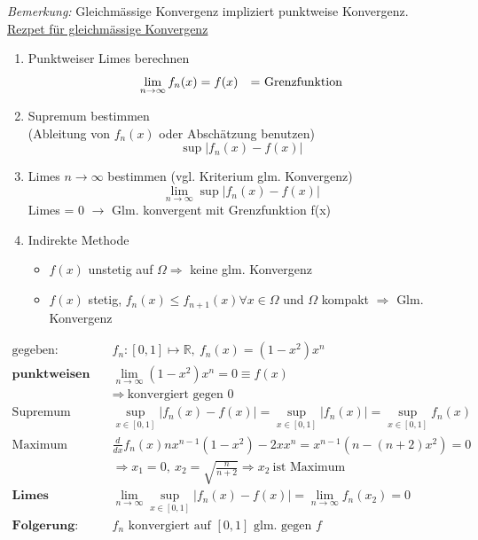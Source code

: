 \emph{Bemerkung:} Gleichm{\"a}ssige Konvergenz impliziert punktweise Konvergenz.\\
\underline{Rezpet f{\"u}r gleichm{\"a}ssige Konvergenz} 
\begin{enumerate}[label=(\roman*)]
	\item Punktweiser Limes berechnen
				\[
						\lim_{n\rightarrow\infty}f_n(x) = f(x) \text{\quad = Grenzfunktion}
				\]
	\item Supremum bestimmen \\
				(Ableitung von $f_n(x)$  oder Absch{\"a}tzung benutzen)
				\[
						\sup|f_n(x) - f(x)|
				\]
	\item Limes $n \to \infty$ bestimmen (vgl. Kriterium glm. Konvergenz)
				\[
						\lim_{n\rightarrow\infty} \sup|f_n(x) - f(x)|
				\]
				Limes = 0 $\rightarrow$ Glm. konvergent mit Grenzfunktion f(x)
	\item Indirekte Methode \\
				\begin{itemize}
					\item $f(x)$ unstetig  auf $\Omega \Rightarrow$ keine glm. Konvergenz	
					\item $f(x)$ stetig, $f_n(x) \leq f_{n+1}(x) \forall x \in \Omega $ und $\Omega$ kompakt $\Rightarrow$ Glm. Konvergenz
				\end{itemize}

\end{enumerate}

\begin{equation*}
\begin{split}
	\text{gegeben:} \quad & f_n:[0,1] \mapsto \mathbb{R},\ f_n(x) = (1 - x^2)x^n \\
	\textbf{punktweisen Limes berechnen:} \quad & \lim_{n \to \infty} (1 - x^2)x^n = 0 \equiv f(x) \\
	& \Rightarrow\ \text{konvergiert gegen 0} \\
	\text{Supremum berechnen:} \quad & \sup_{x \in [0,1]} |f_n(x) -f(x)| = \sup_{x \in [0,1]} |f_n(x)| = \sup_{x \in [0,1]}f_n(x) \\
	\text{Maximum finden:} \quad & \frac{d}{dx} f_n(x) nx^{n-1}(1-x^2)-2xx^n = x^{n-1}(n - (n+2)x^2) = 0 \\
	& \Rightarrow x_1 = 0,\ x_2 = \sqrt{\frac{n}{n+2}} \Rightarrow x_2\ \text{ist Maximum} \\
	\textbf{Limes berechnen:} \quad & \lim_{n \to \infty} \sup_{x \in [0,1]} |f_n(x) - f(x)| = \lim_{n \to \infty} f_n(x_2) = 0 \\
	\textbf{Folgerung:} \quad & \text{$f_n$ konvergiert auf $[0,1]$ glm. gegen $f$}
\end{split}
\end{equation*}

